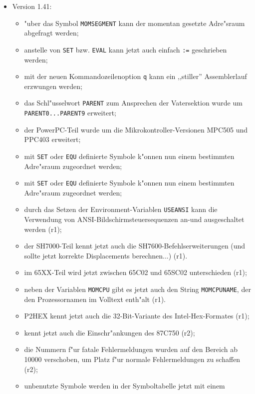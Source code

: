 \documentclass[12pt,a4paper,twoside]{report}
\newcommand{\tty}[1]{{\tt #1}}
\begin{document}
{\begin{itemize}
{\begin{itemize}
{            Notation geschrieben werden (r9).}
      \end{itemize}}
\item{Version 1.41:
      \begin{itemize}
      \item{"uber das Symbol \tty{MOMSEGMENT} kann der momentan
            gesetzte Adre"sraum abgefragt werden;}
      \item{anstelle von \tty{SET} bzw. \tty{EVAL} kann jetzt auch
            einfach \tty{:=} geschrieben werden;}
      \item{mit der neuen Kommandozeilenoption \tty{q} kann ein ,,stiller''
            Assemblerlauf erzwungen werden;}
      \item{das Schl"usselwort \tty{PARENT} zum Ansprechen der
            Vatersektion wurde um \tty{PARENT0...PARENT9} erweitert;}
      \item{der PowerPC-Teil wurde um die Mikrokontroller-Versionen
            MPC505 und PPC403 erweitert;}
      \item{mit \tty{SET} oder \tty{EQU} definierte Symbole k"onnen
            nun einem bestimmten Adre"sraum zugeordnet werden;}
      \item{mit \tty{SET} oder \tty{EQU} definierte Symbole k"onnen
            nun einem bestimmten Adre"sraum zugeordnet werden;}
      \item{durch das Setzen der Environment-Variablen \tty{USEANSI}
            kann die Verwendung von ANSI-Bildschirmsteuersequenzen
            an-und ausgeschaltet werden (r1);}
      \item{der SH7000-Teil kennt jetzt auch die SH7600-Befehlserweiterungen
            (und sollte jetzt korrekte Displacements berechnen...) (r1).}
      \item{im 65XX-Teil wird jetzt zwischen 65C02 und 65SC02 unterschieden
            (r1);}
      \item{neben der Variablen \tty{MOMCPU} gibt es jetzt auch den String
            \tty{MOMCPUNAME}, der den Prozessornamen im Volltext enth"alt (r1).}
      \item{P2HEX kennt jetzt auch die 32-Bit-Variante des
            Intel-Hex-Formates (r1);}
      \item{kennt jetzt auch die Einschr"ankungen des 87C750 (r2);}
      \item{die Nummern f"ur fatale Fehlermeldungen wurden auf den Bereich
            ab 10000 verschoben, um Platz f"ur normale Fehlermeldungen zu
	    schaffen (r2);}
      \item{unbenutzte Symbole werden in der Symboltabelle jetzt mit einem
}
\end{itemize}}
\end{itemize}}
\end{document}
